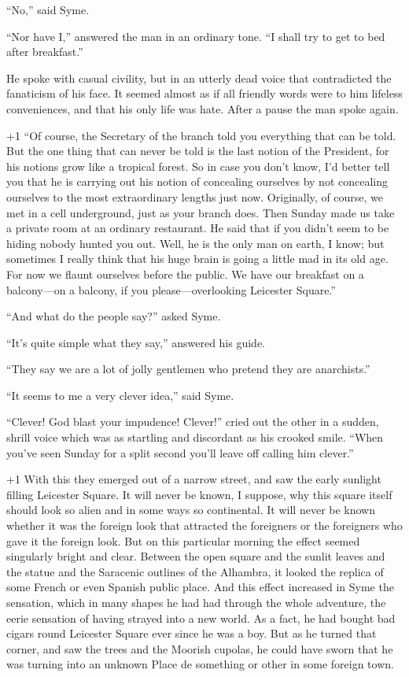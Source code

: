 “No,” said Syme.

“Nor have I,” answered the man in an ordinary tone. “I shall try to get to bed after breakfast.”

He spoke with casual civility, but in an utterly dead voice that contradicted the fanaticism of his face. It seemed almost as if all friendly words were to him lifeless conveniences, and that his only life was hate. After a pause the man spoke again.

\looseness+1
“Of course, the Secretary of the branch told you everything that can be told. But the one thing that can never be told is the last notion of the President, for his notions grow like a tropical forest. So in case you don’t know, I’d better tell you that he is carrying out his notion of concealing ourselves by not concealing ourselves to the most extraordinary lengths just now. Originally, of course, we met in a cell underground, just as your branch does. Then Sunday made us take a private room at an ordinary restaurant. He said that if you didn’t seem to be hiding nobody hunted you out. Well, he is the only man on earth, I know; but sometimes I really think that his huge brain is going a little mad in its old age. For now we flaunt ourselves before the public. We have our breakfast on a balcony⁠—on a balcony, if you please⁠—overlooking Leicester Square.”

“And what do the people say?” asked Syme.

“It’s quite simple what they say,” answered his guide.

“They say we are a lot of jolly gentlemen who pretend they are anarchists.”

“It seems to me a very clever idea,” said Syme.

“Clever! God blast your impudence! Clever!” cried out the other in a sudden, shrill voice which was as startling and discordant as his crooked smile. “When you’ve seen Sunday for a split second you’ll leave off calling him clever.”

\looseness+1
With this they emerged out of a narrow street, and saw the early sunlight filling Leicester Square. It will never be known, I suppose, why this square itself should look so alien and in some ways so continental. It will never be known whether it was the foreign look that attracted the foreigners or the foreigners who gave it the foreign look. But on this particular morning the effect seemed singularly bright and clear. Between the open square and the sunlit leaves and the statue and the Saracenic outlines of the Alhambra, it looked the replica of some French or even Spanish public place. And this effect increased in Syme the sensation, which in many shapes he had had through the whole adventure, the eerie sensation of having strayed into a new world. As a fact, he had bought bad cigars round Leicester Square ever since he was a boy. But as he turned that corner, and saw the trees and the Moorish cupolas, he could have sworn that he was turning into an unknown Place de something or other in some foreign town.

